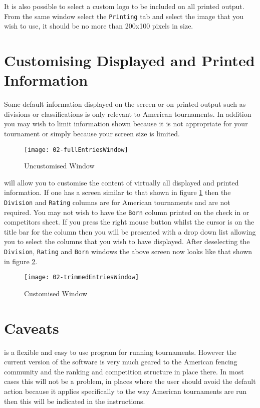 \documentclass[a4paper,11pt]{memoir}
\begin{document}
It is also possible to select a custom logo to be included on all printed output. From the same window select the \texttt{Printing} tab and select the image that you wish to use, it should be no more than 200x100 pixels in size.

\section{Customising Displayed and Printed Information}
Some default information displayed on the screen or on printed output such as divisions or classifications is only relevant to American tournaments. In addition you may wish to limit information shown because it is not appropriate for your tournament or simply because your screen size is limited.

\begin{figure}[!ht]
 \centering
 \texttt{[image: 02-fullEntriesWindow]}
 \caption{Uncustomised Window} \label{fig:02-uncustomisedWindow}
\end{figure}

\fencingtime{} will allow you to customise the content of virtually all displayed and printed information. If one has a screen similar to that shown in figure \ref{fig:02-uncustomisedWindow} then the \texttt{Division} and \texttt{Rating} columns are for American tournaments and are not required. You may not wish to have the \texttt{Born} column printed on the check in or competitors sheet. If you press the right mouse button whilst the cursor is on the title bar for the column then you will be presented with a drop down list allowing you to select the columns that you wish to have displayed. After deselecting the \texttt{Division}, \texttt{Rating} and \texttt{Born} windows the above screen now looks like that shown in figure \ref{fig:02-customisedWindow}.

\begin{figure}[!ht]
 \centering
 \texttt{[image: 02-trimmedEntriesWindow]}
 \caption{Customised Window} \label{fig:02-customisedWindow}
\end{figure}

\section{Caveats}
\fencingtime{} is a flexible and easy to use program for running tournaments. However the current version of the software is very much geared to the American fencing community and the \gls{ranking} and \gls{competition} structure in place there. In most cases this will not be a problem, in places where the user should avoid the default action because it applies specifically to the way American tournaments are run then this will be indicated in the instructions.
\end{document}
